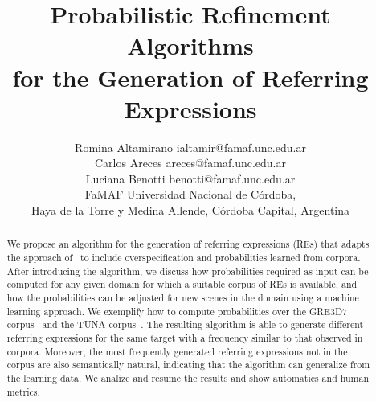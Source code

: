 \documentclass[jair,twoside,11pt,theapa]{article}
\begin{document}
\title{Probabilistic Refinement Algorithms\\
for the Generation of Referring Expressions}

\author{\name Romina Altamirano \email ialtamir@famaf.unc.edu.ar \\
       \name Carlos Areces \email areces@famaf.unc.edu.ar \\
       \name Luciana Benotti \email benotti@famaf.unc.edu.ar \\ 
       \addr FaMAF Universidad Nacional de C\'ordoba, \\
       Haya de la Torre y Medina Allende, C\'ordoba Capital, Argentina
}


\maketitle


\begin{abstract}
  We propose an algorithm for the generation of referring expressions
  (REs) that adapts the approach
  of~\cite{arec2:2008:Areces,arec:usin11} to include
  overspecification and probabilities learned from corpora.  After
  introducing the algorithm, we discuss how probabilities required as
  input can be computed for any given domain for which a suitable
  corpus of REs is available, and how the probabilities can be
  adjusted for new scenes in the domain using a machine learning
  approach.  We exemplify how to compute probabilities over the GRE3D7
  corpus~\cite{viet:gene11} and the TUNA
  corpus~\cite{gatt-balz-kow:2008:ENLG}.  The resulting algorithm
  is able to generate different referring expressions for the same
  target with a frequency similar to that observed in
  corpora. Moreover, the most frequently generated referring
  expressions not in the corpus are also semantically natural,
  indicating that the algorithm can generalize from the learning
  data. We analize and resume the results and show automatics and
  human metrics.
\end{abstract}



\end{document}
